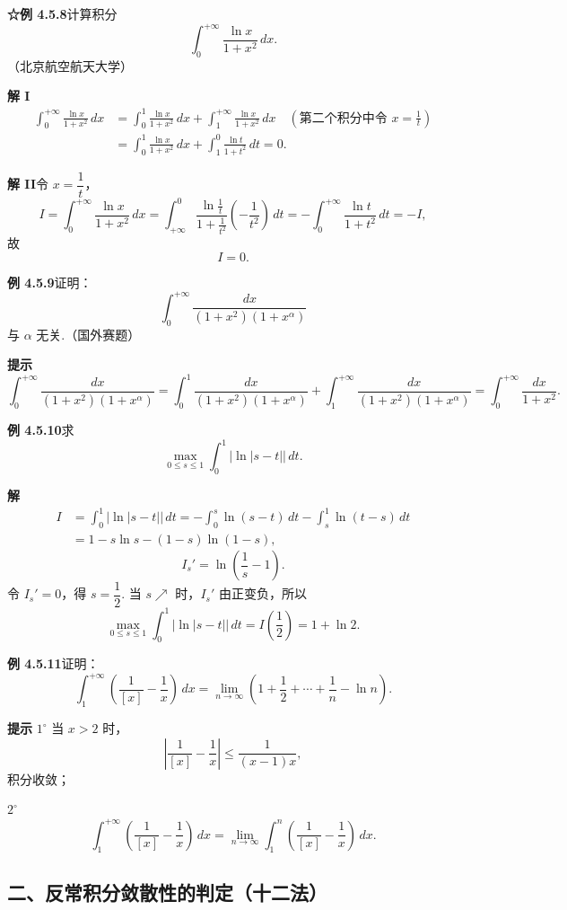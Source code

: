 \documentclass[UTF8,12pt,a4paper,fontset=fandol]{ctexart}
\begin{document}
\noindent\textbf{☆例 4.5.8}\quad 计算积分
\[
\int_0^{+\infty}\frac{\ln x}{1+x^2}\,dx.
\]
（北京航空航天大学）

\noindent\textbf{解 I}\quad
\[
\begin{aligned}
\int_0^{+\infty}\frac{\ln x}{1+x^2}\,dx
&=\int_0^1\frac{\ln x}{1+x^2}\,dx
+\int_1^{+\infty}\frac{\ln x}{1+x^2}\,dx
\quad\left(\text{第二个积分中令 }x=\frac1t\right)\\
&=\int_0^1\frac{\ln x}{1+x^2}\,dx
+\int_1^0\frac{\ln t}{1+t^2}\,dt=0.
\end{aligned}
\]

\noindent\textbf{解 II}\quad 令 $x=\dfrac1t$，
\[
I=\int_0^{+\infty}\frac{\ln x}{1+x^2}\,dx
=\int_{+\infty}^0
\frac{\ln\frac1t}{1+\frac1{t^2}}\left(-\frac1{t^2}\right)\,dt
=-\int_0^{+\infty}\frac{\ln t}{1+t^2}\,dt=-I,
\]
故
\[
I=0.
\]

\noindent\textbf{例 4.5.9}\quad 证明：
\[
\int_0^{+\infty}\frac{dx}{(1+x^2)(1+x^\alpha)}
\]
与 $\alpha$ 无关.（国外赛题）

\noindent\textbf{提示}\quad
\[
\int_0^{+\infty}\frac{dx}{(1+x^2)(1+x^\alpha)}
=\int_0^1\frac{dx}{(1+x^2)(1+x^\alpha)}
+\int_1^{+\infty}\frac{dx}{(1+x^2)(1+x^\alpha)}
=\int_0^{+\infty}\frac{dx}{1+x^2}.
\]

\noindent\textbf{例 4.5.10}\quad 求
\[
\max_{0\le s\le1}\int_0^1|\ln|s-t||\,dt.
\]

\noindent\textbf{解}\quad
\[
\begin{aligned}
I&=\int_0^1|\ln|s-t||\,dt
=-\int_0^s\ln(s-t)\,dt-\int_s^1\ln(t-s)\,dt\\
&=1-s\ln s-(1-s)\ln(1-s),
\end{aligned}
\]
\[
I_s'=\ln\left(\frac1s-1\right).
\]
令 $I_s'=0$，得 $s=\dfrac12$.
当 $s\nearrow$ 时，$I_s'$ 由正变负，所以
\[
\max_{0\le s\le1}\int_0^1|\ln|s-t||\,dt
=I\left(\frac12\right)=1+\ln2.
\]

\noindent\textbf{例 4.5.11}\quad 证明：
\[
\int_1^{+\infty}\left(\frac1{[x]}-\frac1x\right)\,dx
=\lim_{n\to\infty}\left(1+\frac12+\cdots+\frac1n-\ln n\right).
\]

\noindent\textbf{提示}\quad
$1^\circ$ 当 $x>2$ 时，
\[
\left|\frac1{[x]}-\frac1x\right|\le\frac1{(x-1)x},
\]
积分收敛；

$2^\circ$
\[
\int_1^{+\infty}\left(\frac1{[x]}-\frac1x\right)\,dx
=\lim_{n\to\infty}\int_1^n\left(\frac1{[x]}-\frac1x\right)\,dx.
\]

\subsection*{二、反常积分敛散性的判定（十二法）}
\end{document}
